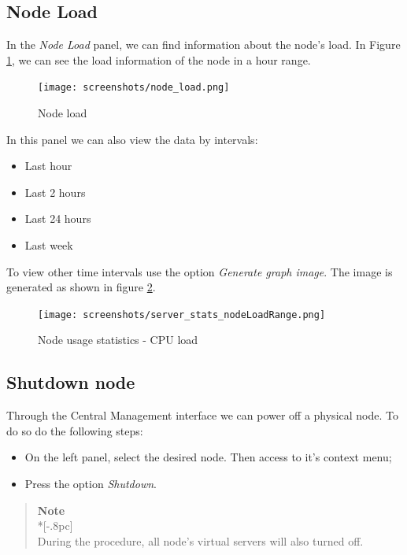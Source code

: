 \subsection{Node Load}
\label{sec:nodeload}
In the \emph{Node Load} panel, we can find information about the node's load. In Figure \ref{fig:node_load}, we can see the load information of the node in a hour range.



\begin{figure}[H]
        \begin{center}
        \texttt{[image: screenshots/node\_load.png]}
        \caption{Node load}
        \label{fig:node_load}
        \end{center}
\end{figure}

In this panel we can also view the data by intervals:
\begin{itemize}
	\item Last hour
	\item Last 2 hours
	\item Last 24 hours
	\item Last week
\end{itemize}
To view other time intervals use the option \emph{Generate graph image}. The image is generated as shown in figure \ref{fig:server_stats_nodeLoadRange}.

\begin{figure}[H]
	\begin{center}
	\texttt{[image: screenshots/server\_stats\_nodeLoadRange.png]}
	\caption{Node usage statistics - CPU load}
	\label{fig:server_stats_nodeLoadRange}
	\end{center}
\end{figure}

\subsection{Shutdown node}
\label{sub:shutdown_node}
Through the Central Management interface we can power off a physical node. To do so do the following steps:

\begin{itemize}
\item On the left panel, select the desired node. Then access to it's context menu;
\item Press the option \textit{Shutdown}.
\end{itemize}

\begin{quote}
    {\large \bf Note} \\*[-.8pc]
    \underline{\hspace{6in}} \\
    During the procedure, all node's virtual servers will also turned off.
\end{quote}


